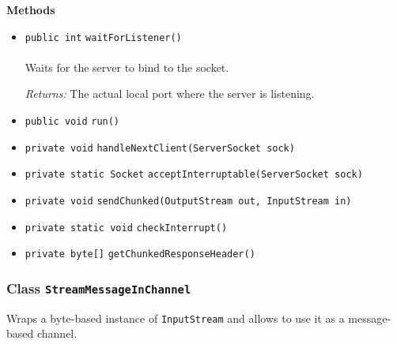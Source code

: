 \textbf{\sffamily Methods}
\begin{itemize}
\item \lstinline|public int| \lstinline|waitForListener|\lstinline|()|\\ \\[-0.6em]
Waits for the server to bind to the socket.

\emph{Returns:} The actual local port where the server is listening.

\item \lstinline|public void| \lstinline|run|\lstinline|()| \\[-0.6em]




\item \lstinline|private void| \lstinline|handleNextClient|\lstinline|(ServerSocket sock)| \\[-0.6em]




\item \lstinline|private static Socket| \lstinline|acceptInterruptable|\lstinline|(ServerSocket sock)| \\[-0.6em]




\item \lstinline|private void| \lstinline|sendChunked|\lstinline|(OutputStream out, InputStream in)| \\[-0.6em]




\item \lstinline|private static void| \lstinline|checkInterrupt|\lstinline|()| \\[-0.6em]




\item \lstinline|private byte[]| \lstinline|getChunkedResponseHeader|\lstinline|()| \\[-0.6em]




\end{itemize}

\subsubsection{Class \lstinline|StreamMessageInChannel|}
Wraps a byte-based instance of \lstinline|InputStream| and allows to use it as a
 message-based channel. \\
\noindent\begin{minipage}[t]{5cm}
\vspace{0.3em}
\hspace*{2em}
\vspace{0.3em}
\end{minipage}




